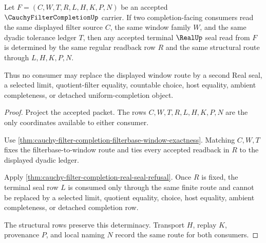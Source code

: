 \begin{theorem}
\label{thm:cauchy-filter-completion-window-real-seal-determinacy}
Let $F=(C,W,T,R,L,H,K,P,N)$ be an accepted $\CauchyFilterCompletionUp$ carrier. If two completion-facing consumers read the same displayed filter source $C$, the same window family $W$, and the same dyadic tolerance ledger $T$, then any accepted terminal $\RealUp$ seal read from $F$ is determined by the same regular readback row $R$ and the same structural route through $L,H,K,P,N$.

Thus no consumer may replace the displayed window route by a second Real seal, a selected limit, quotient-filter equality, countable choice, host equality, ambient completeness, or detached uniform-completion object.
\end{theorem}
\begin{proof}
Project the accepted packet. The rows $C,W,T,R,L,H,K,P,N$ are the only coordinates available to either consumer.

Use \autoref{thm:cauchy-filter-completion-filterbase-window-exactness}. Matching $C,W,T$ fixes the filterbase-to-window route and ties every accepted readback in $R$ to the displayed dyadic ledger.

Apply \autoref{thm:cauchy-filter-completion-real-seal-refusal}. Once $R$ is fixed, the terminal seal row $L$ is consumed only through the same finite route and cannot be replaced by a selected limit, quotient equality, choice, host equality, ambient completeness, or detached completion row.

The structural rows preserve this determinacy. Transport $H$, replay $K$, provenance $P$, and local naming $N$ record the same route for both consumers.
\end{proof}

